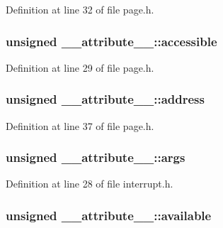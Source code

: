 \-Definition at line 32 of file page.\-h.

\hypertarget{struct____attribute_____ac16120b81080d11c5a6004609ac55d78}{
\subsubsection[{accessible}]{\setlength{\rightskip}{0pt plus 5cm}unsigned {\bf \-\_\-\-\_\-attribute\-\_\-\-\_\-\-::accessible}}}\label{struct____attribute_____ac16120b81080d11c5a6004609ac55d78}


\-Definition at line 29 of file page.\-h.

\hypertarget{struct____attribute_____a85e46dba0f375cb39265b72e5ce1c61d}{
\subsubsection[{address}]{\setlength{\rightskip}{0pt plus 5cm}unsigned {\bf \-\_\-\-\_\-attribute\-\_\-\-\_\-\-::address}}}\label{struct____attribute_____a85e46dba0f375cb39265b72e5ce1c61d}


\-Definition at line 37 of file page.\-h.

\hypertarget{struct____attribute_____a7f4aa46a00fcf46f5d2611ee31723c50}{
\subsubsection[{args}]{\setlength{\rightskip}{0pt plus 5cm}unsigned {\bf \-\_\-\-\_\-attribute\-\_\-\-\_\-\-::args}}}\label{struct____attribute_____a7f4aa46a00fcf46f5d2611ee31723c50}


\-Definition at line 28 of file interrupt.\-h.

\hypertarget{struct____attribute_____a5347d18afffc812a05861c31e9f4fd8b}{
\subsubsection[{available}]{\setlength{\rightskip}{0pt plus 5cm}unsigned {\bf \-\_\-\-\_\-attribute\-\_\-\-\_\-\-::available}}}\label{struct____attribute_____a5347d18afffc812a05861c31e9f4fd8b}


